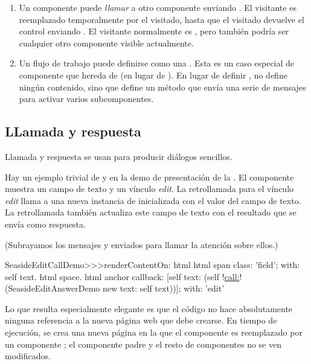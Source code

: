 \documentclass[a4paper,10pt,twoside]{book}
\begin{document}
\begin{enumerate}
  \item Un componente puede \emph{llamar} a otro componente enviando .
El visitante es reemplazado temporalmente por el visitado, hasta que el visitado devuelve el control enviando .
El visitante normalmente es , pero también podría ser cualquier otro componente visible actualmente.

  \item Un flujo de trabajo puede definirse como una .
  Esta es un caso especial de componente que hereda de  (en lugar de ). 
  En lugar de definir , no define ningún contenido, sino que define un método  que envía una serie de mensajes  para activar varios subcomponentes.
\end{enumerate}

\subsection{LLamada y respuesta}

Llamada y respuesta se usan para producir diálogos sencillos.

Hay un ejemplo trivial de  y  en la demo de presentación de la .
El componente  muestra un campo de texto y un vínculo \emph{edit}.
La retrollamada para el vínculo \emph{edit} llama a una nueva instancia de  inicializada con el valor del campo de texto.
La retrollamada también actualiza este campo de texto con el resultado que se envía como respuesta.

(Subrayamos los mensajes  y  enviados para llamar la atención sobre ellos.)

\begin{code}{}
SeasideEditCallDemo>>>renderContentOn: html 
	html span
		class: 'field';
		with: self text.
	html space.
	html anchor
		callback: [self text: (self !\underline{call:}! (SeasideEditAnswerDemo new text: self text))];
		with: 'edit'
\end{code}{}

Lo que resulta especialmente elegante es que el código no hace absolutamente ninguna referencia a la nueva página web que debe crearse.
En tiempo de ejecución, se crea una nueva página en la que el componente  es reemplazado por un componente ; el componente padre y el resto de componentes no se ven modificados.
\end{document}
